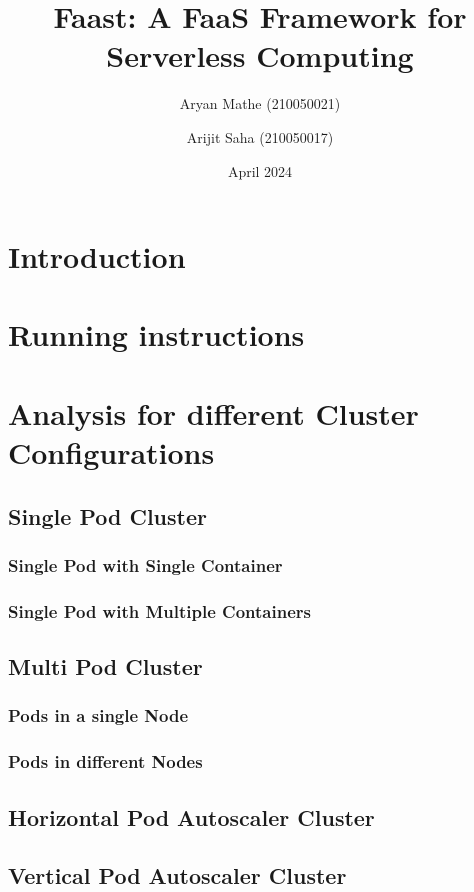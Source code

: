 \documentclass{article}
\title{Faast: A FaaS Framework for Serverless Computing}
\author{Aryan Mathe (210050021) \and Arijit Saha (210050017)}
\date{April 2024}
\begin{document}
	\maketitle
	\section{Introduction}

	\section{Running instructions}
	\section{Analysis for different Cluster Configurations}

	\subsection{Single Pod Cluster}
	\subsubsection{Single Pod with Single Container}
	\subsubsection{Single Pod with Multiple Containers}

	\subsection{Multi Pod Cluster}
	\subsubsection{Pods in a single Node}
	\subsubsection{Pods in different Nodes}

	\subsection{Horizontal Pod Autoscaler Cluster}
	\subsection{Vertical Pod Autoscaler Cluster}
\end{document}
